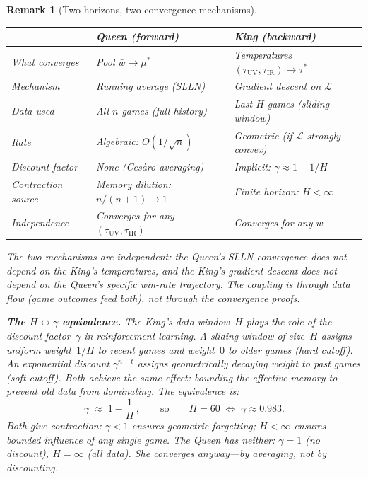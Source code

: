 \documentclass[11pt,a4paper]{article}
\newtheorem{remark}[theorem]{Remark}
\newcommand{\cL}{\mathcal{L}}
\begin{document}
\begin{remark}[Two horizons, two convergence mechanisms]
\begin{center}
\small
\begin{tabular}{@{}lll@{}}
\toprule
& \textbf{Queen (forward)} & \textbf{King (backward)} \\
\midrule
What converges &
  Pool $\bar{w} \to \mu^*$ &
  Temperatures $(\tau_{\mathrm{UV}}, \tau_{\mathrm{IR}}) \to \tau^*$ \\
Mechanism &
  Running average (SLLN) &
  Gradient descent on $\cL$ \\
Data used &
  All $n$ games (full history) &
  Last $H$ games (sliding window) \\
Rate &
  Algebraic: $O(1/\sqrt{n})$ &
  Geometric (if $\cL$ strongly convex) \\
Discount factor &
  None (Ces\`{a}ro averaging) &
  Implicit: $\gamma \approx 1 - 1/H$ \\
Contraction source &
  Memory dilution: $n/(n{+}1) \to 1$ &
  Finite horizon: $H < \infty$ \\
Independence &
  Converges for \emph{any} $(\tau_{\mathrm{UV}}, \tau_{\mathrm{IR}})$ &
  Converges for \emph{any} $\bar{w}$ \\
\bottomrule
\end{tabular}
\end{center}

\noindent
The two mechanisms are \emph{independent}:
the Queen's SLLN convergence does not depend on the
King's temperatures, and the King's gradient descent
does not depend on the Queen's specific win-rate trajectory.
The coupling is through \emph{data flow}
(game outcomes feed both), not through the convergence proofs.

\medskip\noindent
\textbf{The $H \leftrightarrow \gamma$ equivalence.}\;
The King's data window~$H$ plays the role of the
discount factor~$\gamma$ in reinforcement learning.
A sliding window of size~$H$ assigns uniform weight~$1/H$
to recent games and weight~$0$ to older games (hard cutoff).
An exponential discount $\gamma^{n-t}$ assigns geometrically
decaying weight to past games (soft cutoff).
Both achieve the same effect: bounding the \emph{effective
memory} to prevent old data from dominating.
The equivalence is:
\begin{equation}\label{eq:H-gamma}
  \gamma \;\approx\; 1 - \frac{1}{H}\,,
  \qquad\text{so}\qquad
  H = 60 \;\Longleftrightarrow\;
  \gamma \approx 0.983.
\end{equation}
Both give contraction:
$\gamma < 1$ ensures geometric forgetting;
$H < \infty$ ensures bounded influence of any single game.
The Queen has neither: $\gamma = 1$ (no discount),
$H = \infty$ (all data).
She converges anyway---by averaging, not by discounting.


\end{remark}
\end{document}
